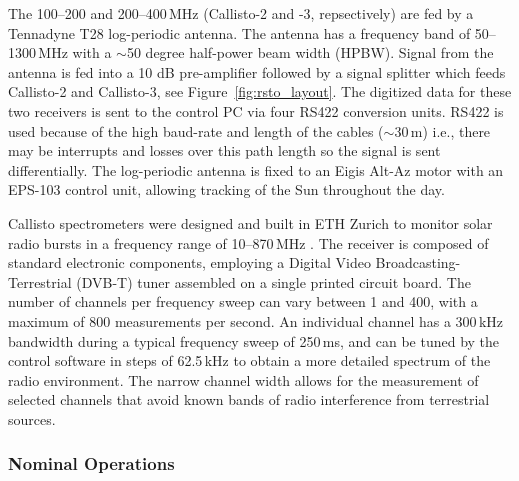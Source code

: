 The 100--200 and 200--400\,MHz (Callisto-2 and -3, repsectively) are fed by a Tennadyne T28 log-periodic antenna. The antenna has a frequency band of 50--1300\,MHz with a $\sim$50 degree half-power beam width (HPBW). Signal from the antenna is fed into a 10 dB pre-amplifier followed by a signal splitter which feeds Callisto-2 and Callisto-3, see Figure~\ref{fig:rsto_layout}. The digitized data for these two receivers is sent to the control PC via four RS422 conversion units. RS422 is used because of the high baud-rate and length of the cables ($\sim30$\,m) i.e., there may be interrupts and losses over this path length so the signal is sent differentially. The log-periodic antenna is fixed to an Eigis Alt-Az motor with an EPS-103 control unit, allowing tracking of the Sun throughout the day. 

Callisto spectrometers were designed and built in ETH Zurich to monitor solar radio bursts in a frequency range of 10--870\,MHz \citep{Benz2005}. The receiver is composed of standard electronic components, employing a Digital Video Broadcasting-Terrestrial (DVB-T) tuner assembled on a single printed circuit board. The number of channels per frequency sweep can vary between 1 and 400, with a maximum of 800 measurements per second. An individual channel has a 300\,kHz bandwidth during a typical frequency sweep of 250\,ms, and can be tuned by the control software in steps of 62.5\,kHz to obtain a more detailed spectrum of the radio environment. The narrow channel width allows for the measurement of selected channels that avoid known bands of radio interference from terrestrial sources.

\subsubsection{Nominal Operations}

